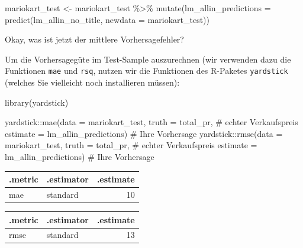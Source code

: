 \documentclass[
  letterpaper,
  oneside,
  open=any]{scrbook}
\newenvironment{Shaded}{\begin{snugshade}}{\end{snugshade}}
\newcommand{\AttributeTok}[1]{\textcolor[rgb]{0.40,0.45,0.13}{#1}}
\newcommand{\CommentTok}[1]{\textcolor[rgb]{0.37,0.37,0.37}{#1}}
\newcommand{\FunctionTok}[1]{\textcolor[rgb]{0.28,0.35,0.67}{#1}}
\newcommand{\NormalTok}[1]{\textcolor[rgb]{0.00,0.23,0.31}{#1}}
\newcommand{\OtherTok}[1]{\textcolor[rgb]{0.00,0.23,0.31}{#1}}
\newcommand{\SpecialCharTok}[1]{\textcolor[rgb]{0.37,0.37,0.37}{#1}}
\theoremstyle{definition}
\theoremstyle{definition}
\theoremstyle{definition}
\theoremstyle{remark}
\begin{document}
\begin{Shaded}
\begin{Highlighting}[]
\NormalTok{mariokart\_test }\OtherTok{\textless{}{-}}
\NormalTok{  mariokart\_test }\SpecialCharTok{\%\textgreater{}\%} 
  \FunctionTok{mutate}\NormalTok{(}\AttributeTok{lm\_allin\_predictions =} \FunctionTok{predict}\NormalTok{(lm\_allin\_no\_title, }\AttributeTok{newdata =}\NormalTok{ mariokart\_test))}
\end{Highlighting}
\end{Shaded}

Okay, was ist jetzt der mittlere Vorhersagefehler?

Um die Vorhersagegüte im Test-Sample auszurechnen (wir verwenden dazu
die Funktionen \texttt{mae} und \texttt{rsq}, nutzen wir die Funktionen
des R-Paketes \texttt{yardstick} (welches Sie vielleicht noch
installieren müssen):

\begin{Shaded}
\begin{Highlighting}[]
\FunctionTok{library}\NormalTok{(yardstick)}

\NormalTok{yardstick}\SpecialCharTok{::}\FunctionTok{mae}\NormalTok{(}\AttributeTok{data =}\NormalTok{ mariokart\_test,}
               \AttributeTok{truth =}\NormalTok{ total\_pr,  }\CommentTok{\# echter Verkaufspreis}
               \AttributeTok{estimate =}\NormalTok{ lm\_allin\_predictions)  }\CommentTok{\# Ihre Vorhersage}
\NormalTok{yardstick}\SpecialCharTok{::}\FunctionTok{rmse}\NormalTok{(}\AttributeTok{data =}\NormalTok{ mariokart\_test,}
               \AttributeTok{truth =}\NormalTok{ total\_pr,  }\CommentTok{\# echter Verkaufspreis}
               \AttributeTok{estimate =}\NormalTok{ lm\_allin\_predictions)  }\CommentTok{\# Ihre Vorhersage}
\end{Highlighting}
\end{Shaded}

\begin{longtable}[]{@{}llr@{}}
\toprule\noalign{}
.metric & .estimator & .estimate \\
\midrule\noalign{}
\endhead
\bottomrule\noalign{}
\endlastfoot
mae & standard & 10 \\
\end{longtable}

\begin{longtable}[]{@{}llr@{}}
\toprule\noalign{}
.metric & .estimator & .estimate \\
\midrule\noalign{}
\endhead
\bottomrule\noalign{}
\endlastfoot
rmse & standard & 13 \\
\end{longtable}
\end{document}
